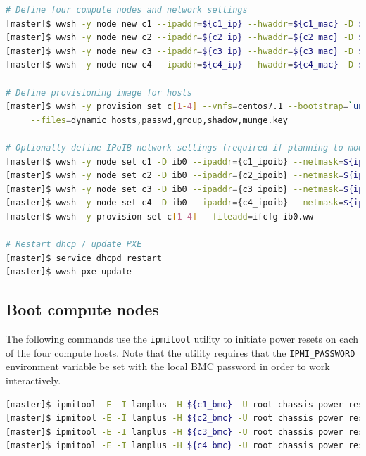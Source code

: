 \documentclass[letterpaper]{article}
\begin{document}

\begin{lstlisting}[language=bash,keywords={},upquote=true,basicstyle=\footnotesize\ttfamily]
# Define four compute nodes and network settings 
[master]$ wwsh -y node new c1 --ipaddr=${c1_ip} --hwaddr=${c1_mac} -D ${eth_provision}
[master]$ wwsh -y node new c2 --ipaddr=${c2_ip} --hwaddr=${c2_mac} -D ${eth_provision}
[master]$ wwsh -y node new c3 --ipaddr=${c3_ip} --hwaddr=${c3_mac} -D ${eth_provision}
[master]$ wwsh -y node new c4 --ipaddr=${c4_ip} --hwaddr=${c4_mac} -D ${eth_provision}

# Define provisioning image for hosts
[master]$ wwsh -y provision set c[1-4] --vnfs=centos7.1 --bootstrap=`uname -r` \
     --files=dynamic_hosts,passwd,group,shadow,munge.key 

# Optionally define IPoIB network settings (required if planning to mount Lustre* over IB)
[master]$ wwsh -y node set c1 -D ib0 --ipaddr={c1_ipoib} --netmask=${ipoib_netmask}
[master]$ wwsh -y node set c2 -D ib0 --ipaddr={c2_ipoib} --netmask=${ipoib_netmask}
[master]$ wwsh -y node set c3 -D ib0 --ipaddr={c3_ipoib} --netmask=${ipoib_netmask}
[master]$ wwsh -y node set c4 -D ib0 --ipaddr={c4_ipoib} --netmask=${ipoib_netmask}
[master]$ wwsh -y provision set c[1-4] --fileadd=ifcfg-ib0.ww

# Restart dhcp / update PXE
[master]$ service dhcpd restart
[master]$ wwsh pxe update
\end{lstlisting}


\subsection{Boot compute nodes} \label{sec:boot_computes}

 
The following commands use the \texttt{ipmitool} utility to initiate power
resets on each of the four compute hosts. Note that the utility requires that
the \texttt{IPMI\_PASSWORD} environment variable be set with the local BMC password in
order to work interactively.


\begin{lstlisting}[language=bash,keywords={},upquote=true]
[master]$ ipmitool -E -I lanplus -H ${c1_bmc} -U root chassis power reset   # power cycle c1
[master]$ ipmitool -E -I lanplus -H ${c2_bmc} -U root chassis power reset   # power cycle c2
[master]$ ipmitool -E -I lanplus -H ${c3_bmc} -U root chassis power reset   # power cycle c3
[master]$ ipmitool -E -I lanplus -H ${c4_bmc} -U root chassis power reset   # power cycle c4
\end{lstlisting} 
\end{document}
